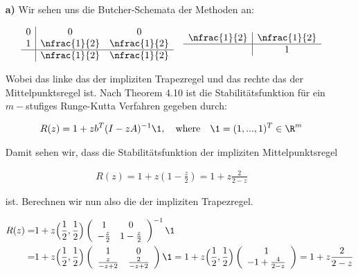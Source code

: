 \begin{solution}
 \begin{itemize}
   \item[\textbf{a)}]Wir sehen uns die Butcher-Schemata der Methoden an:

    \begin{align*}
      \begin{array}{c|cc}
        0 & 0 & 0 \\
        1 & \nfrac{1}{2} & \nfrac{1}{2} \\
        \hline
        & \nfrac{1}{2} & \nfrac{1}{2}
      \end{array}
      \quad
      \begin{array}{c|c}
        \nfrac{1}{2} & \nfrac{1}{2} \\
        \hline
        & 1
      \end{array}
    \end{align*}

    Wobei das linke das der impliziten Trapezregel und das rechte das der Mittelpunktsregel ist.
    Nach Theorem 4.10 ist die Stabilitätsfunktion für ein $m-$stufiges Runge-Kutta
    Verfahren gegeben durch:

    \begin{align*}
      R(z) = 1 +zb^T (I- zA)^{-1} \1, \quad \text{where} \quad \1 =(1,...,1)^T
      \in \R^m
    \end{align*}

    Damit sehen wir, dass die Stabilitätsfunktion der impliziten Mittelpunktsregel

    \begin{align*}
        R(z) = 1 + z\left(1- \frac{z}{2}\right) = 1+z \frac{2}{2-z}
    \end{align*}

    ist. Berechnen wir nun also die der impliziten Trapezregel.

    \begin{align*}
      R(z) =& 1 +z\Big(\frac{1}{2}, \frac{1}{2}\Big) \left(
      \begin{array}{cc}
        1 & 0 \\
        -\frac{z}{2} & 1- \frac{z}{2}
      \end{array}
      \right)^{-1}
      \1 \\
      =& 1 +z \Big(\frac{1}{2}, \frac{1}{2}\Big) \left(
      \begin{array}{cc}
        1 & 0 \\
        \frac{z}{-z+2} & \frac{2}{-z+2}
      \end{array}
      \right)
      \1 = 1+z\Big(\frac{1}{2},\frac{1}{2}\Big) \left(
      \begin{array}{c}
        1 \\
        -1+\frac{4}{2-z}
      \end{array}
      \right) = 1+z\frac{2}{2-z}
    \end{align*}


\end{itemize}
\end{solution}
